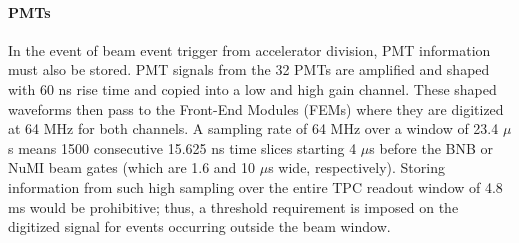 \paragraph{PMTs}
In the event of beam event trigger from accelerator division, PMT information must also be stored. PMT signals from the 32 PMTs are amplified and shaped with 60 ns rise time and copied into a low and high gain channel. These shaped waveforms then pass to the Front-End Modules (FEMs) where they are digitized at 64 MHz for both channels. A sampling rate of 64 MHz over a window of 23.4 $\mu$s means 1500 consecutive 15.625 ns time slices starting 4 $\mu$s before the BNB or NuMI beam gates (which are 1.6 and 10 $\mu$s wide, respectively). Storing information from such high sampling over the entire TPC readout window of 4.8 ms would be prohibitive; thus, a threshold requirement is imposed on the digitized signal for events occurring outside the beam window. \\


